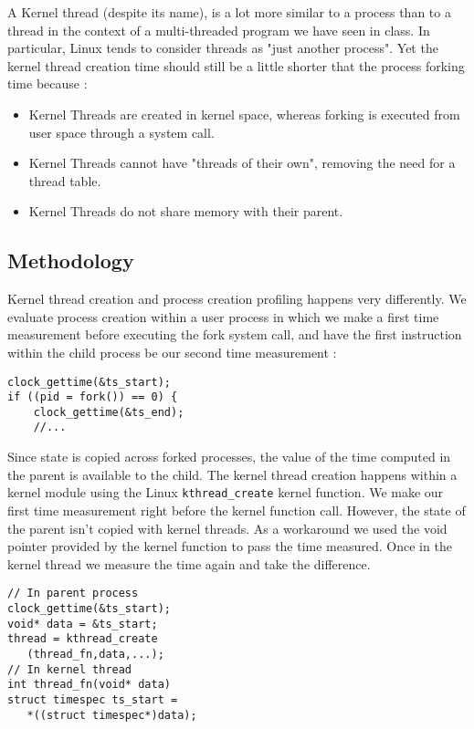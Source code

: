 A Kernel thread (despite its name), is a lot more similar to a process than to a thread in the context of 
a multi-threaded program we have seen in class. In particular, Linux tends to consider threads as "just another process".
Yet the kernel thread creation time should still be a little shorter that the process forking time because :

\begin{itemize}
\item{Kernel Threads are created in kernel space, whereas forking is executed from user space through a system call.}
\item{Kernel Threads cannot have "threads of their own", removing the need for a thread table.}
\item{Kernel Threads do not share memory with their parent.}
\end{itemize} 

\subsection{Methodology}

Kernel thread creation and process creation profiling happens very differently. We evaluate process creation
within a user process in which we make a first time measurement before executing the fork system call, and 
have the first instruction within the child process be our second time measurement :

\begin{lstlisting}
clock_gettime(&ts_start);	
if ((pid = fork()) == 0) {
	clock_gettime(&ts_end);
	//...
\end{lstlisting}

Since state is copied across forked processes, the value of the time computed in the parent is available to the 
child. The kernel thread creation happens within a kernel module using the Linux \texttt{kthread\_create} kernel
function. We make our first time measurement right before the kernel function call. However, the state of the parent isn't copied with kernel threads. As a workaround we used the void pointer provided by the kernel function to pass the time measured.
Once in the kernel thread we measure the time again and take the difference.

\begin{lstlisting}
// In parent process
clock_gettime(&ts_start);	
void* data = &ts_start;
thread = kthread_create
   (thread_fn,data,...);
// In kernel thread
int thread_fn(void* data)
struct timespec ts_start =
   *((struct timespec*)data);
\end{lstlisting}


